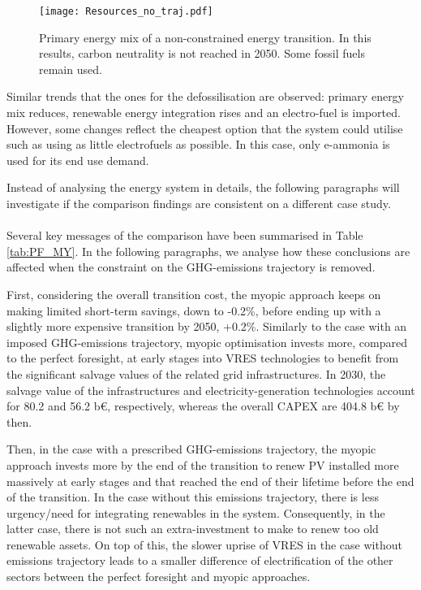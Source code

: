  \begin{figure}[!htbp]
\centering
\texttt{[image: Resources\_no\_traj.pdf]}
\caption{Primary energy mix of a non-constrained energy transition. In this results, carbon neutrality is not reached in 2050. Some fossil fuels remain used.}
\label{fig:EnergyMixPathwayWithoutGHGLimit}
\end{figure}

Similar trends that the ones for the defossilisation are observed: primary energy mix reduces, renewable energy integration rises and an electro-fuel is imported. However, some changes reflect the cheapest option that the system could utilise such as using as little electrofuels as possible. In this case, only e-ammonia is used for its end use demand.

Instead of analysing the energy system in details, the following paragraphs will investigate if the comparison findings are consistent on a different case study.\\

\\

\noindent
Several key messages of the comparison have been summarised in Table \ref{tab:PF_MY}. In the following paragraphs, we analyse how these conclusions are affected when the constraint on the \gls{GHG}-emissions trajectory is removed. 

First, considering the overall transition cost, the myopic approach keeps on making limited short-term savings, \ie down to -0.2\%, before ending up with a slightly more expensive transition by 2050, \ie +0.2\%. Similarly to the case with an imposed \gls{GHG}-emissions trajectory, myopic optimisation invests more, compared to the perfect foresight, at early stages into \gls{VRES} technologies to benefit from the significant salvage values of the related grid infrastructures. In 2030, the salvage value of the infrastructures and electricity-generation technologies account for 80.2 and 56.2 b€, respectively, whereas the overall CAPEX are 404.8 b€ by then.

Then, in the case with a prescribed \gls{GHG}-emissions trajectory, the myopic approach invests more by the end of the transition to renew \gls{PV} installed more massively at early stages and that reached the end of their lifetime before the end of the transition. In the case without this emissions trajectory, there is less urgency/need for integrating renewables in the system. Consequently, in the latter case, there is not such an extra-investment to make to renew too old renewable assets. On top of this, the slower uprise of \gls{VRES} in the case without emissions trajectory leads to a smaller difference of electrification of the other sectors between the perfect foresight and myopic approaches.

